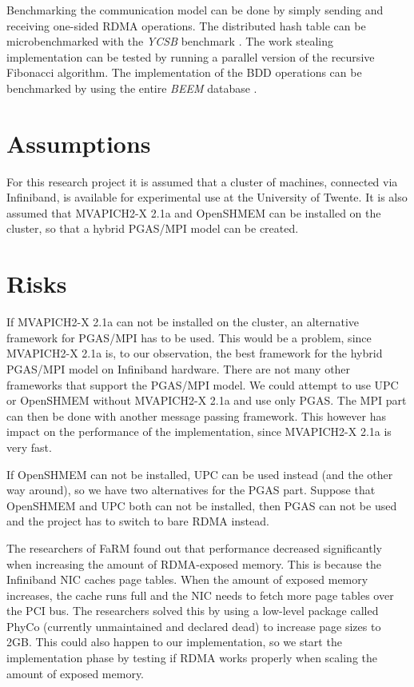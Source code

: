 Benchmarking the communication model can be done by simply sending and receiving one-sided RDMA operations. The distributed hash table can be microbenchmarked with the \emph{YCSB} benchmark \cite{cooper2010benchmarking}. The work stealing implementation can be tested by running a parallel version of the recursive Fibonacci algorithm. The implementation of the BDD operations can be benchmarked by using the entire \emph{BEEM} database \cite{pelanek2007beem}.

\section{Assumptions}
For this research project it is assumed that a cluster of machines, connected via Infiniband, is available for experimental use at the University of Twente. It is also assumed that MVAPICH2-X 2.1a and OpenSHMEM can be installed on the cluster, so that a hybrid PGAS/MPI model can be created. 

\section{Risks}
If MVAPICH2-X 2.1a can not be installed on the cluster, an alternative framework for PGAS/MPI has to be used. This would be a problem, since MVAPICH2-X 2.1a is, to our observation, the best framework for the hybrid PGAS/MPI model on Infiniband hardware. There are not many other frameworks that support the PGAS/MPI model. We could attempt to use UPC \cite{upc} or OpenSHMEM \cite{openshmem} without MVAPICH2-X 2.1a and use only PGAS. The MPI part can then be done with another message passing framework. This however has impact on the performance of the implementation, since MVAPICH2-X 2.1a is very fast.

If OpenSHMEM can not be installed, UPC can be used instead (and the other way around), so we have two alternatives for the PGAS part. Suppose that OpenSHMEM and UPC both can not be installed, then PGAS can not be used and the project has to switch to bare RDMA instead.

The researchers of FaRM \cite{farm} found out that performance decreased significantly when increasing the amount of RDMA-exposed memory. This is because the Infiniband NIC caches page tables. When the amount of exposed memory increases, the cache runs full and the NIC needs to fetch more page tables over the PCI bus. The researchers solved this by using a low-level package called PhyCo (currently unmaintained and declared dead) to increase page sizes to 2GB. This could also happen to our implementation, so we start the implementation phase by testing if RDMA works properly when scaling the amount of exposed memory. 

